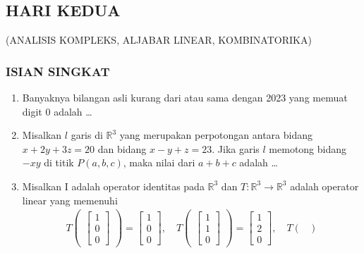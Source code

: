 \documentclass[12pt,twoside]{article}
\newcommand{\R}{\mathbb{R}}
\begin{document}
\subsection{HARI KEDUA}
\begin{center}
	(ANALISIS KOMPLEKS, ALJABAR LINEAR, KOMBINATORIKA)
\end{center}
\subsubsection*{ISIAN SINGKAT}
\begin{enumerate}
	\item  Banyaknya bilangan asli kurang dari atau sama dengan 2023 yang memuat digit $0$ adalah \dots
	\item Misalkan $l$ garis di $\R^3$ yang merupakan perpotongan antara bidang $x+2y+3z=20$ dan bidang $x-y+z=23$. Jika garis $l$ memotong bidang$-xy$ di titik $P(a,b,c)$, maka nilai dari $a+b+c$ adalah \dots
	\item Misalkan I adalah operator identitas pada $\R^3$ dan $T:\R^3\rightarrow\R^3$ adalah operator linear yang memenuhi
	      \begin{align*}
		      T\begin{pmatrix}
			       \begin{bmatrix}
				      1 \\ 0 \\ 0
			      \end{bmatrix}
		       \end{pmatrix}=\begin{bmatrix}
			                     1 \\ 0 \\0
		                     \end{bmatrix}, \quad T\begin{pmatrix}
			                                           \begin{bmatrix}
				      1 \\ 1 \\ 0
			      \end{bmatrix}
		                                           \end{pmatrix}= \begin{bmatrix}
			                                                          1 \\ 2 \\ 0
		                                                          \end{bmatrix}
		      , \quad T\begin{pmatrix}

\end{pmatrix}
\end{align*}
\end{enumerate}
\end{document}
